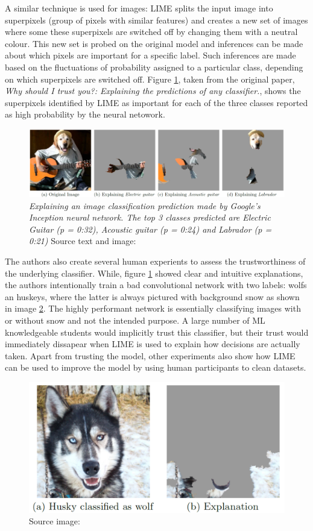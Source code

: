 \documentclass[proposal]{softeng}
\begin{document}
A similar technique is used for images: LIME splits the input image into superpixels (group of pixels with similar features) and creates a new set of images where some these superpixels are switched off by changing them with a neutral colour. This  new set is probed on the original model and inferences can be made about which pixels are important for a specific label. Such inferences are made based on the fluctuations of probability assigned to a particular class, depending on which superpixels are switched off. Figure \ref{fig:lime_paper_dog}, taken from the original paper, \textit{Why should I trust you?: Explaining the predictions of any classifier.}, shows the superpixels identified by LIME as important for each of the three classes reported as high probability by the neural netowork.

\begin{figure}[h!]
\centering
  \includegraphics[width=.8\textwidth]{images/lime_paper_dog.png}
  \caption{\textit{Explaining an image classification prediction made by Google's Inception neural network. The top
3 classes predicted are Electric Guitar (p = 0:32), Acoustic guitar (p = 0:24) and Labrador (p = 0:21)} Source text and image: \cite{RibeiroMarcoTulio2016WSIT}}
  \label{fig:lime_paper_dog}
\end{figure}

The authors also create several human experients to assess the trustworthiness of the underlying classifier. While, figure \ref{fig:lime_paper_dog} showed clear and intuitive explanations, the authors intentionally train a bad convolutional network with two labels: wolfs an huskeys, where the latter is always pictured with background snow as shown in image \ref{fig:lime_paper_huskey}. The highly performant network is essentially classifying images with or without snow and not the intended purpose. A large number of ML knowledgeable students would implicitly trust this classifier, but their trust would immediately dissapear when LIME is used to explain how decisions are actually taken. Apart from trusting the model, other experiments also show how LIME can be used to improve the model by using human participants to clean datasets.

\begin{figure}[h!]
\centering
  \includegraphics[width=.4\textwidth]{images/lime_paper_huskey.png}
  \caption{Source image: \cite{RibeiroMarcoTulio2016WSIT}}
  \label{fig:lime_paper_huskey}
\end{figure}
\end{document}
